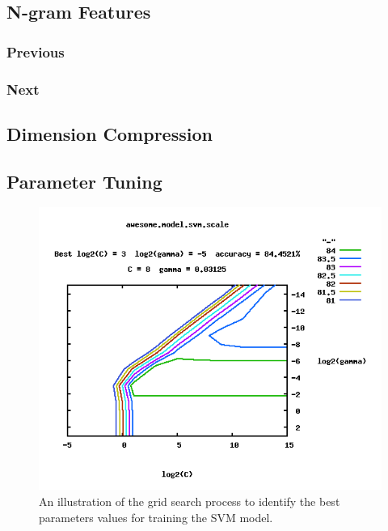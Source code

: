 \documentclass[preprint]{style}
\begin{document}
\subsection{N-gram Features}

\subsubsection{Previous}

\subsubsection{Next}

\subsection{Dimension Compression}


\subsection{Parameter Tuning}

\begin{figure}
\begin{center}
	\includegraphics[width=1\columnwidth]{figures/parameter-selection.png}
\end{center}
\caption{An illustration of the grid search process to identify the best parameters values for training the SVM model.}
\label{fig:parameter_selection}
\end{figure}
\end{document}
